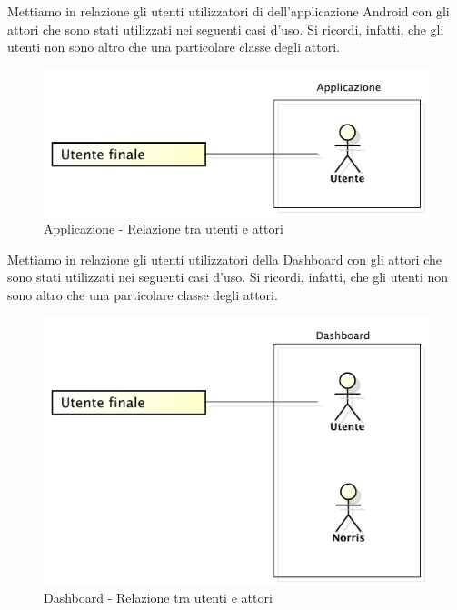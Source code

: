 	Mettiamo in relazione gli utenti utilizzatori di dell'applicazione Android con gli attori che sono stati utilizzati nei seguenti casi d'uso. Si ricordi, infatti, che gli utenti non sono altro che una particolare classe degli attori.
	\begin{figure}[H]
		\centering
		\includegraphics[scale=0.4]{Pics/UtentiAttoriApplicazione}
		\caption{Applicazione - Relazione tra utenti e attori}
	\end{figure}
	

	Mettiamo in relazione gli utenti utilizzatori della Dashboard con gli attori che sono stati utilizzati nei seguenti casi d'uso. Si ricordi, infatti, che gli utenti non sono altro che una particolare classe degli attori.
	\begin{figure}[H]
		\centering
		\includegraphics[scale=0.4]{Pics/UtentiAttoriDashboard}
		\caption{Dashboard - Relazione tra utenti e attori}
	\end{figure}
	

